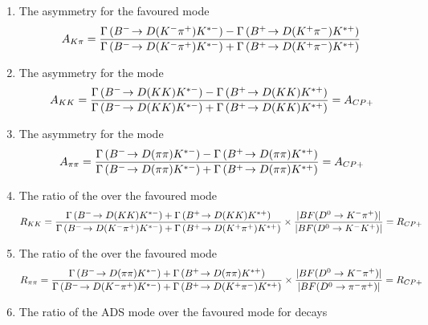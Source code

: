 \begin{enumerate}
\item{The \CP asymmetry for the favoured mode
\begin{equation}
A_{{K}\pi} = \frac{\Gamma\left({{{B}^-}}\!\rightarrow {\ensuremath{D}}({{K}^-}{{\pi}^+}){{K}^{*-}}\right) - \Gamma\left({{{B}^+}}\!\rightarrow {\ensuremath{D}}({{K}^+}{{\pi}^-}){{K}^{*+}}\right)}{\Gamma\left({{{B}^-}}\!\rightarrow {\ensuremath{D}}({{K}^-}{{\pi}^+}){{K}^{*-}}\right) + \Gamma\left({{{B}^+}}\!\rightarrow {\ensuremath{D}}({{K}^+}{{\pi}^-}){{K}^{*+}}\right)}
\label{eqn:Akpi}
\end{equation}
}
\item{The \CP asymmetry for the \decay{\D}{\Kp\Km} mode
\begin{equation}
A_{{K}{K}} = \frac{\Gamma\left({{{B}^-}}\!\rightarrow {\ensuremath{D}}({K}{K}){{K}^{*-}}\right) - \Gamma\left({{{B}^+}}\!\rightarrow {\ensuremath{D}}({K}{K}){{K}^{*+}}\right)}{\Gamma\left({{{B}^-}}\!\rightarrow {\ensuremath{D}}({K}{K}){{K}^{*-}}\right) + \Gamma\left({{{B}^+}}\!\rightarrow {\ensuremath{D}}({K}{K}){{K}^{*+}}\right)} = A_{CP+}
\label{eqn:Akk}
\end{equation}
}
\item{The \CP asymmetry for the \decay{\D}{\pip\pim} mode
\begin{equation}
A_{\pi\pi} = \frac{\Gamma\left({{{B}^-}}\!\rightarrow {\ensuremath{D}}(\pi\pi){{K}^{*-}}\right) - \Gamma\left({{{B}^+}}\!\rightarrow {\ensuremath{D}}(\pi\pi){{K}^{*+}}\right)}{\Gamma\left({{{B}^-}}\!\rightarrow {\ensuremath{D}}(\pi\pi){{K}^{*-}}\right) + \Gamma\left({{{B}^+}}\!\rightarrow {\ensuremath{D}}(\pi\pi){{K}^{*+}}\right)} = A_{CP+}
\label{eqn:Apipi}
\end{equation}
}
\item{The ratio of the \decay{\D}{\Kp\Km} over the favoured mode
\begin{equation}
R_{{K}{K}} = \frac{\Gamma\left({{{B}^-}}\!\rightarrow {\ensuremath{D}}({K}{K}){{K}^{*-}}\right) + \Gamma\left({{{B}^+}}\!\rightarrow {\ensuremath{D}}({K}{K}){{K}^{*+}}\right)}{\Gamma\left({{{B}^-}}\!\rightarrow {\ensuremath{D}}({{K}^-}{{\pi}^+}){{K}^{*-}}\right) + \Gamma\left({{{B}^+}}\!\rightarrow {\ensuremath{D}}({{K}^+}{{\pi}^+}){{K}^{*+}}\right)} \times \frac{|BF(D^0 \rightarrow K^-\pi^+)|}{|BF(D^0 \rightarrow K^-K^+)|} = R_{CP+}
\label{eqn:Rkk}
\end{equation}
}
\item{The ratio of the \decay{\D}{\pip\pim} over the favoured mode
\begin{equation}
R_{\pi\pi} = \frac{\Gamma\left({{{B}^-}}\!\rightarrow {\ensuremath{D}}(\pi\pi){{K}^{*-}}\right) + \Gamma\left({{{B}^+}}\!\rightarrow {\ensuremath{D}}(\pi\pi){{K}^{*+}}\right)}{\Gamma\left({{{B}^-}}\!\rightarrow {\ensuremath{D}}({{K}^-}{{\pi}^+}){{K}^{*-}}\right) + \Gamma\left({{{B}^+}}\!\rightarrow {\ensuremath{D}}({{K}^+}{{\pi}^-}){{K}^{*+}}\right)} \times \frac{|BF(D^0 \rightarrow K^-\pi^+)|}{|BF(D^0 \rightarrow \pi^-\pi^+)|} = R_{CP+}
\label{eqn:Rpipi}
\end{equation}
}
\item{The ratio of the ADS mode over the favoured mode for \Bp decays
}
\end{enumerate}
